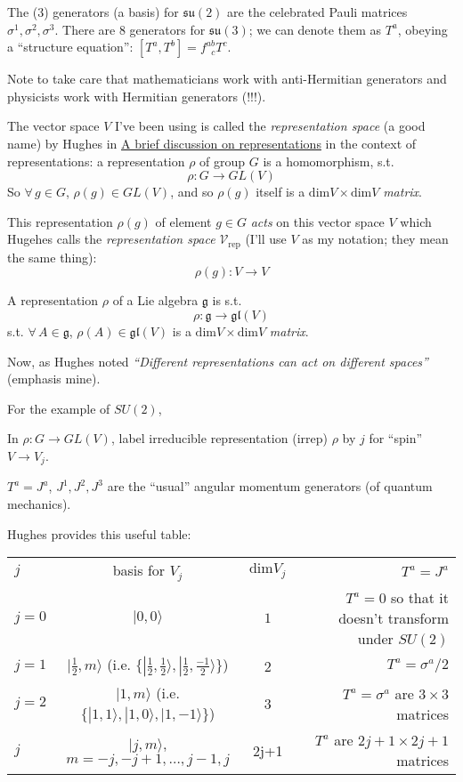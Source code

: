 \documentclass[10pt]{amsart}
\begin{document}
The (3) generators (a basis) for $\mathfrak{su}(2)$ are the celebrated Pauli matrices $\sigma^1, \sigma^2, \sigma^3$.  There are 8 generators for $\mathfrak{su}(3)$; we can denote them as $T^a$, obeying a ``structure equation'': $[T^a,T^b] = f^{ab}_{ \; \; c}T^c$.  

Note to take care that mathematicians work with anti-Hermitian generators and physicists work with Hermitian generators (!!!).  

The vector space $V$ I've been using is called the \emph{representation space} (a good name) by Hughes in \href{http://www.damtp.cam.ac.uk/user/ch558/pdf/Representations.pdf}{A brief discussion on representations} in the context of representations: a representation $\rho$ of group $G$ is a homomorphism, s.t.
\[
\rho : G \to GL(V)
\]
So $\forall \, g \in G$, $\rho(g) \in GL(V)$, and so $\rho(g)$ itself is a $\text{dim}V\times \text{dim}V$ \emph{matrix}.  

This representation $\rho(g)$ of element $g\in G$ \emph{acts} on this vector space $V$ which Hugehes calls the \emph{representation space} $\mathcal{V}_{\text{rep}}$ (I'll use $V$ as my notation; they mean the same thing):
\[
\rho(g) : V \to V
\]

A representation $\rho$ of a Lie algebra $\mathfrak{g}$ is s.t.
\[
\rho : \mathfrak{g} \to \mathfrak{gl}(V)
\]
s.t. $\forall \, A \in \mathfrak{g}$, $\rho(A) \in \mathfrak{gl}(V)$ is a $\text{dim}V \times \text{dim}V$ \emph{matrix}.  

Now, as Hughes noted \emph{``Different representations can act on different spaces''} (emphasis mine).  

For the example of $SU(2)$,

In $\rho :G\to GL(V)$, label irreducible representation (irrep) $\rho$ by $j$ for ``spin'' $V\to V_j$.  

$T^a = J^a$, $J^1, J^2,J^3$ are the ``usual'' angular momentum generators (of quantum mechanics).  

Hughes provides this useful table: 

\begin{tabular}{l | c | c | r }
$j$   & basis for $V_j$  &  $\text{dim}V_j$  & $T^a = J^a$  \\
$j=0$  & $ |0,0\rangle$   &  $1$              & $T^a =0$ so that it doesn't transform under $SU(2)$  \\
$j=1$  & $ |\frac{1}{2} , m \rangle$ (i.e. $\lbrace |\frac{1}{2}, \frac{1}{2} \rangle, |\frac{1}{2} , \frac{-1}{2} \rangle \rbrace$) & 2 & $T^a = \sigma^a /2$ \\ 
$j=2$  & $ |1 , m \rangle$ (i.e. $\lbrace | 1, 1 \rangle, | 1 , 0 \rangle , | 1,-1\rangle \rbrace$) & 3 & $T^a = \sigma^a $ are $3\times 3$ matrices \\ 
$j$  & $ |j , m \rangle$, $m=-j,-j+1,\dots , j-1, j$  & 2j+1 & $T^a$ are $2j+1 \times 2j+1$ matrices \\ 
\end{tabular}
  
\end{document}
